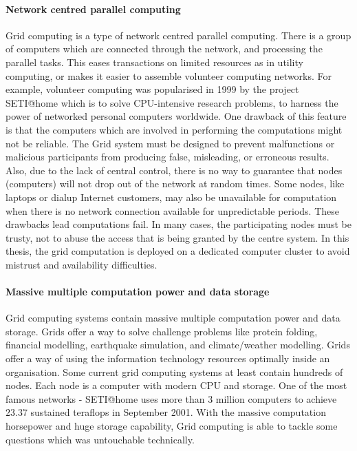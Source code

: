 \paragraph{Network centred parallel computing} 
Grid computing is a type of network centred parallel computing. There is a group of computers which are connected through the network, and processing the parallel tasks. This eases transactions on limited resources as in utility computing, or makes it easier to assemble volunteer computing networks. For example, volunteer computing was popularised in 1999 by the project SETI@home \cite{Anderson2002} which is to solve CPU-intensive research problems, to harness the power of networked personal computers worldwide. One drawback of this feature is that the computers which are involved in performing the computations might not be reliable. The Grid system must be designed to prevent malfunctions or malicious participants from producing false, misleading, or erroneous results. Also, due to the lack of central control, there is no way to guarantee that nodes (computers) will not drop out of the network at random times. Some nodes, like laptops or dialup Internet customers, may also be unavailable for computation when there is no network connection available for unpredictable periods. These drawbacks lead computations fail. In many cases, the participating nodes must be trusty, not to abuse the access that is being granted by the centre system. In this thesis, the grid computation is deployed on a dedicated computer cluster to avoid mistrust and availability difficulties.

\paragraph{Massive multiple computation power and data storage}
Grid computing systems contain massive multiple computation power and data storage. Grids offer a way to solve challenge problems like protein folding, financial modelling, earthquake simulation, and climate/weather modelling. Grids offer a way of using the information technology resources optimally inside an organisation. Some current grid computing systems at least contain hundreds of nodes. Each node is a computer with modern CPU and storage. One of the most famous networks - SETI@home uses more than 3 million computers to achieve $23.37$ sustained teraflops in September 2001. With the massive computation horsepower and huge storage capability, Grid computing is able to tackle some questions which was untouchable technically.

